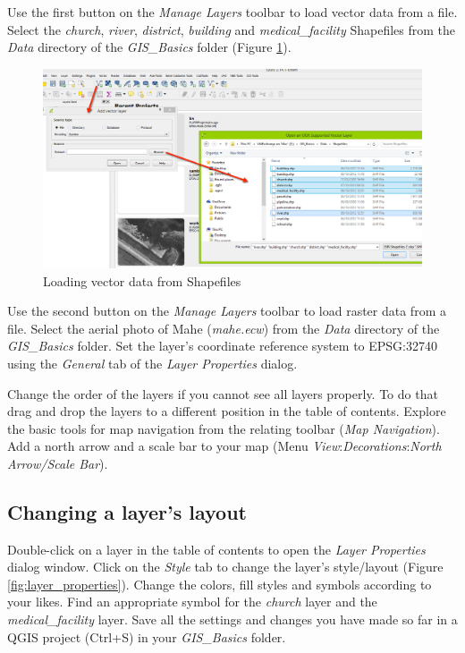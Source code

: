 \documentclass[a4paper,12pt,titlepage]{article}
\begin{document}
Use the first button on the \textit{Manage Layers} toolbar to load vector data from a file. Select the \textit{church}, \textit{river}, \textit{district}, \textit{building} and \textit{medical\_facility} Shapefiles from the \textit{Data} directory of the \textit{GIS\_Basics} folder (Figure \ref{fig:load_vector_data}).

\begin{figure}[h]
\centering
\includegraphics[width=12cm]{Images/load_vector_data.png}
\caption{Loading vector data from Shapefiles}\label{fig:load_vector_data}
\end{figure}

Use the second button on the \textit{Manage Layers} toolbar to load raster data from a file. Select the aerial photo of Mahe (\textit{mahe.ecw}) from the \textit{Data} directory of the \textit{GIS\_Basics} folder. Set the layer's coordinate reference system to EPSG:32740 using the \textit{General} tab of the \textit{Layer Properties} dialog.

Change the order of the layers if you cannot see all layers properly. To do that drag and drop the layers to a different position in the table of contents. Explore the basic tools for map navigation from the relating toolbar (\textit{Map Navigation}). Add a north arrow and a scale bar to your map (Menu \textit{View}:\textit{Decorations}:\textit{North Arrow/Scale Bar}).

\subsection{Changing a layer's layout}

Double-click on a layer in the table of contents to open the \textit{Layer Properties} dialog window.
Click on the \textit{Style} tab to change the layer's style/layout (Figure \ref{fig:layer_properties}). Change the colors, fill styles and symbols according to your likes. Find an appropriate symbol for the \textit{church} layer and the \textit{medical\_facility} layer. Save all the settings and changes you have made so far in a QGIS project (Ctrl+S) in your \textit{GIS\_Basics} folder.
\end{document}
